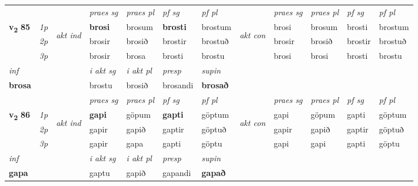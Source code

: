 \begin{longtable}[l]{X>{\footnotesize\itshape}llXXXXlXXXX}
 & &   & \textit{praes sg}  & \textit{praes pl}    & \textit{ pf sg} & \textit{pf pl} & & \textit{praes sg}  & \textit{praes pl}    & \textit{pf sg} & \textit{pf pl }  \\ \cmidrule{4-7} \cmidrule{9-12}
 \multirow{2}{*}{{{\textbf{v{\textsubscript{2}}} \Large{\textbf{85}}}}}  & 1p & \multirow{3}{*}{\begin{turn}{90}\textit{akt ind}\end{turn}} & \textbf{brosi} & brosum & \textbf{brosti} & brostum & \multirow{3}{*}{\begin{turn}{90}\textit{akt con}\end{turn}} &brosi & brosum & brosti & brostum\\*
 & 2p &  &  brosir  & brosið & brostir & brostuð & & brosir & brosið & brostir & brostuð \\*
 & 3p &  & brosir & brosa & brosti & brostu & & brosi & brosi& brosti & brostu \\*
\cmidrule{4-7} \cmidrule{9-12}

   {\textit{inf}} & &  & \textit{i akt sg} & \textit{i akt pl}   & \textit{presp} & \textit{supin}   \\*
  {\textbf{brosa}} & && brostu  & brosið   & brosandi &  \textbf{brosað}   \\*

\midrule

 & &   & \textit{praes sg}  & \textit{praes pl}    & \textit{ pf sg} & \textit{pf pl} & & \textit{praes sg}  & \textit{praes pl}    & \textit{pf sg} & \textit{pf pl }  \\ \cmidrule{4-7} \cmidrule{9-12}
 \multirow{2}{*}{{{\textbf{v{\textsubscript{2}}} \Large{\textbf{86}}}}}  & 1p & \multirow{3}{*}{\begin{turn}{90}\textit{akt ind}\end{turn}} & \textbf{gapi} & göpum & \textbf{gapti} & göptum & \multirow{3}{*}{\begin{turn}{90}\textit{akt con}\end{turn}} &gapi & göpum & gapti & göptum\\*
 & 2p &  &  gapir  & gapið & gaptir & göptuð & & gapir & gapið & gaptir & göptuð \\*
 & 3p &  & gapir & gapa & gapti & göptu & & gapi & gapi& gapti & göptu \\*
\cmidrule{4-7} \cmidrule{9-12}

   {\textit{inf}} & &  & \textit{i akt sg} & \textit{i akt pl}   & \textit{presp} & \textit{supin}   \\*
  {\textbf{gapa}} & && gaptu  & gapið   & gapandi &  \textbf{gapað}   \\*


\end{longtable}
